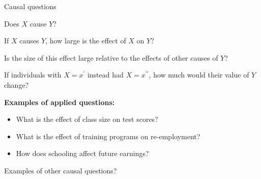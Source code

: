 \documentclass[compress, 8pt]{beamer}
\begin{document}
\begin{frame}{Causal questions}


\begin{figure}
\end{figure}

\vspace{2ex}
Does $X$ cause $Y$?

\pause
\vspace{2ex}
If $X$ causes $Y$, how large is the effect of $X$ on $Y$?

\pause
\vspace{2ex}
Is the size of this effect large relative to the effects of other causes of $Y$?

\pause
\vspace{2ex}
If individuals with $X = x^\prime$ instead had $X = x^{\prime\prime}$, how much would their value of $Y$ change?

\pause
\vspace{2ex}
\textbf{Examples of applied questions:}
\begin{itemize}
    \item What is the effect of class size on test scores?
    \item What is the effect of training programs on re-employment?
    \item How does schooling affect future earnings?
\end{itemize}
Examples of other causal questions?

\end{frame}
\end{document}
